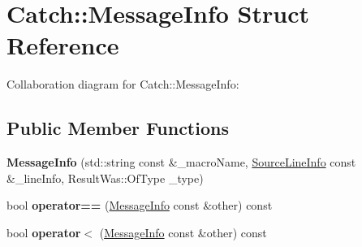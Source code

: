 \hypertarget{structCatch_1_1MessageInfo}{}\section{Catch\+:\+:Message\+Info Struct Reference}
\label{structCatch_1_1MessageInfo}


Collaboration diagram for Catch\+:\+:Message\+Info\+:
\subsection*{Public Member Functions}
\begin{DoxyCompactItemize}
\item 
{\bfseries Message\+Info} (std\+::string const \&\+\_\+macro\+Name, \hyperlink{structCatch_1_1SourceLineInfo}{Source\+Line\+Info} const \&\+\_\+line\+Info, Result\+Was\+::\+Of\+Type \+\_\+type)\hypertarget{structCatch_1_1MessageInfo_a2e336c33ebef7af3c1bbae6a56e14f8a}{}\label{structCatch_1_1MessageInfo_a2e336c33ebef7af3c1bbae6a56e14f8a}

\item 
bool {\bfseries operator==} (\hyperlink{structCatch_1_1MessageInfo}{Message\+Info} const \&other) const \hypertarget{structCatch_1_1MessageInfo_a30fe117138e568c5a9dfdabb7de6e790}{}\label{structCatch_1_1MessageInfo_a30fe117138e568c5a9dfdabb7de6e790}

\item 
bool {\bfseries operator$<$} (\hyperlink{structCatch_1_1MessageInfo}{Message\+Info} const \&other) const \hypertarget{structCatch_1_1MessageInfo_a7a2b1ec3772cd35176e2ee25a94be16a}{}\label{structCatch_1_1MessageInfo_a7a2b1ec3772cd35176e2ee25a94be16a}

\end{DoxyCompactItemize}
